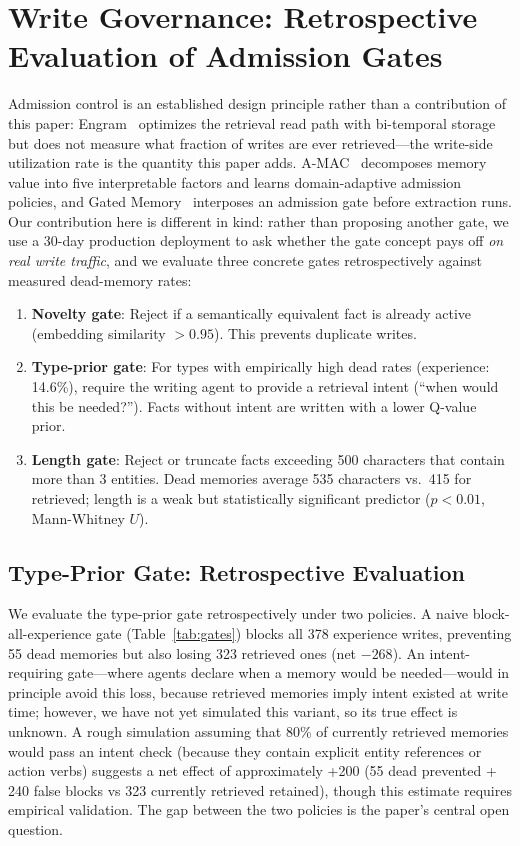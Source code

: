 \documentclass[10pt,twocolumn]{article}
\begin{document}
\section{Write Governance: Retrospective Evaluation of Admission Gates}

Admission control is an established design principle rather than a contribution of this
paper: Engram~\cite{engram} optimizes the retrieval read path with bi-temporal storage but does not
measure what fraction of writes are ever retrieved---the write-side utilization rate is the
quantity this paper adds. A-MAC~\cite{amac} decomposes memory value into five interpretable factors and learns
domain-adaptive admission policies, and Gated Memory~\cite{gatedmem} interposes an admission
gate before extraction runs. Our contribution here is different in kind: rather than proposing
another gate, we use a 30-day production deployment to ask whether the gate concept pays off
\emph{on real write traffic}, and we evaluate three concrete gates retrospectively against
measured dead-memory rates:

\begin{enumerate}
\item \textbf{Novelty gate}: Reject if a semantically equivalent fact is already active (embedding similarity $> 0.95$). This prevents duplicate writes.
\item \textbf{Type-prior gate}: For types with empirically high dead rates (experience: 14.6\%), require the writing agent to provide a retrieval intent (``when would this be needed?''). Facts without intent are written with a lower Q-value prior.
\item \textbf{Length gate}: Reject or truncate facts exceeding 500 characters that contain more than 3 entities. Dead memories average 535 characters vs.\ 415 for retrieved; length is a weak but statistically significant predictor ($p < 0.01$, Mann-Whitney $U$).
\end{enumerate}

\subsection{Type-Prior Gate: Retrospective Evaluation}

We evaluate the type-prior gate retrospectively under two policies. A naive block-all-experience gate (Table~\ref{tab:gates}) blocks all 378 experience writes, preventing 55 dead memories but also losing 323 retrieved ones (net $-268$). An intent-requiring gate---where agents declare when a memory would be needed---would in principle avoid this loss, because retrieved memories imply intent existed at write time; however, we have not yet simulated this variant, so its true effect is unknown. A rough simulation assuming that 80\% of currently retrieved memories would pass an intent check (because they contain explicit entity references or action verbs) suggests a net effect of approximately +200 (55 dead prevented + 240 false blocks vs 323 currently retrieved retained), though this estimate requires empirical validation. The gap between the two policies is the paper's central open question.
\end{document}

